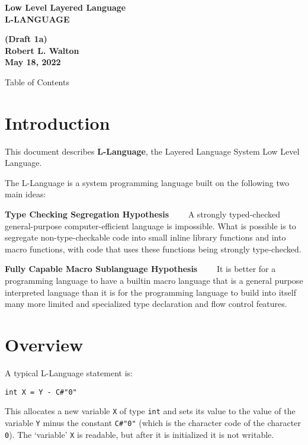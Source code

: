 \documentclass[12pt]{article}
\makeatletter
\renewcommand\tableofcontents{%
    \begin{list}{}%
	     {\setlength{\itemsep}{0in}%
	      \setlength{\topsep}{0in}%
	      \setlength{\parsep}{1ex}%
	      \setlength{\labelwidth}{0in}%
	      \setlength{\baselineskip}{1.5ex}%
	      \setlength{\leftmargin}{0.4in}%
	      \setlength{\rightmargin}{0.4in}}%
    \item\@starttoc{toc}%
    \end{list}}
\newcommand{\key}[1]{{\rm \bfseries #1}}
\newenvironment{indpar}[1][0.3in]%
	{\begin{list}{}%
		     {\setlength{\itemsep}{0in}%
		      \setlength{\topsep}{0in}%
		      \setlength{\parsep}{1ex}%
		      \setlength{\labelwidth}{#1}%
		      \setlength{\leftmargin}{#1}%
		      \addtolength{\leftmargin}{\labelsep}}%
	 \item}%
	{\end{list}}
\makeatother
\begin{document}
        
\begin{center}
\Large \bf
Low Level Layered Language\\[0.5ex]
\huge \bf
L-LANGUAGE
\end{center}
\begin{center}
\large \bf
(Draft 1a)
\\[0.5ex]
Robert L. Walton\\
May 18, 2022

\bigskip
 
Table of Contents
\end{center}

\bigskip

\tableofcontents 

\newpage

\section{Introduction}

This document describes \key{L-Language}, the Layered Language
System Low Level Language.

The L-Language is a system programming language built on the
following two main ideas:

\begin{indpar}

\key{Type Checking Segregation Hypothesis}~~~~ A strongly typed-checked
general-purpose computer-efficient language is impossible.
What is possible is
to segregate non-type-checkable code into small inline
library functions and into macro functions,
with code that uses these functions being
strongly type-checked.

\key{Fully Capable Macro Sublanguage Hypothesis}~~~~ It is better for
a programming language to have a builtin macro language that
is a general purpose interpreted language than it is for the
programming language to build into itself
many more limited and specialized type declaration and
flow control features.

\end{indpar}

\section{Overview}

A typical L-Language statement is:
\begin{indpar}\begin{verbatim}
int X = Y - C#"0"
\end{verbatim}\end{indpar}
This allocates a new variable {\tt X} of type {\tt int}
and sets its value to the value of the
variable {\tt Y} minus the constant {\tt C\#"0"} (which is
the character code of the character {\tt 0}).
The `variable' {\tt X} is readable, but after it is
initialized it is not writable.
\end{document}
